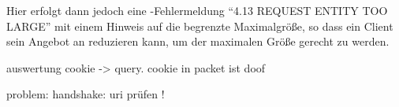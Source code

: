 Hier erfolgt dann jedoch eine -Fehlermeldung "`4.13 REQUEST ENTITY TOO LARGE"' mit einem Hinweis auf die begrenzte Maximalgröße,
so dass ein Client sein Angebot an  reduzieren kann, um der maximalen Größe gerecht zu werden.

auswertung cookie -> query. cookie in packet ist doof

problem: handshake: uri prüfen !